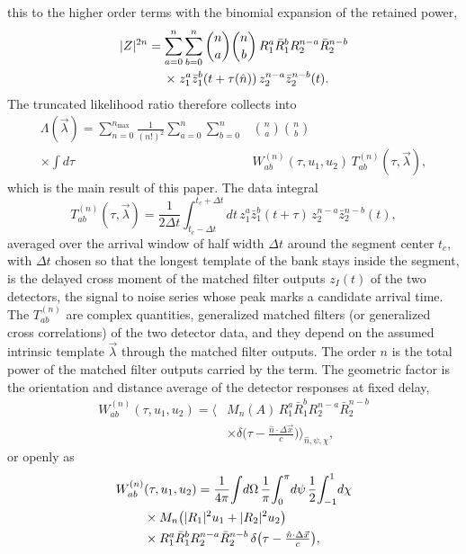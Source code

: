 \documentclass[aps,prd,twocolumn,superscriptaddress,nofootinbib]{revtex4-2}
\begin{document}
this to the higher order terms with the binomial expansion of the
retained power,
\begin{align}
|Z|^{2n} = \sum_{a=0}^{n}\sum_{b=0}^{n}
\binom{n}{a}\binom{n}{b}\,
& R_1^{a} \bar R_1^{b} R_2^{n-a} \bar R_2^{n-b}\notag\\
\times\; z_1^{a} \bar z_1^{b}(t + \tau(\hat n))\,
& z_2^{n-a} \bar z_2^{n-b}(t).
\label{eq:binomn}
\end{align}
The truncated likelihood ratio therefore collects into
\begin{equation}
\begin{aligned}
\Lambda(\vec\lambda) = \sum_{n=0}^{n_{\max}} \frac{1}{(n!)^2}
\sum_{a=0}^{n} \sum_{b=0}^{n} & \binom{n}{a} \binom{n}{b} \\
\times \int d\tau\, & W^{(n)}_{ab}(\tau, u_1, u_2)\,
T^{(n)}_{ab}(\tau, \vec\lambda),
\end{aligned}
\label{eq:master}
\end{equation}
which is the main result of this paper. The data integral
\begin{equation}
T^{(n)}_{ab}(\tau, \vec\lambda) = \frac{1}{2\Delta t}
\int_{t_c - \Delta t}^{t_c + \Delta t} dt\,
z_1^{a} \bar z_1^{b}(t + \tau)\, z_2^{n-a} \bar z_2^{n-b}(t),
\label{eq:T}
\end{equation}
averaged over the arrival window of half width $\Delta t$ around the
segment center $t_c$, with $\Delta t$ chosen so that the longest
template of the bank stays inside the segment, is the delayed cross
moment of the
matched filter outputs $z_I(t)$ of the two detectors, the signal to
noise series whose peak marks a candidate arrival time. The
$T^{(n)}_{ab}$ are complex quantities, generalized matched filters
(or generalized cross correlations) of the two detector data, and
they depend on the
assumed intrinsic template $\vec\lambda$ through the matched filter
outputs. The order $n$
is the total power of the matched filter outputs carried by the term.
The geometric factor is the orientation and distance average of the
detector responses at fixed delay,
\begin{equation}
\begin{aligned}
W^{(n)}_{ab}(\tau, u_1, u_2) = \Big\langle
& M_n(A)\, R_1^{a} \bar R_1^{b} R_2^{n-a} \bar R_2^{n-b} \\
& \times \delta\big( \tau - \tfrac{\hat n \cdot \Delta \vec x}{c} \big)
\Big\rangle_{\hat n, \psi, \chi},
\end{aligned}
\label{eq:W}
\end{equation}
or openly as
\begin{align}
W^{(n)}_{ab}&(\tau, u_1, u_2)
= \frac{1}{4\pi}\!\int\! d\Omega\,
\frac{1}{\pi}\!\int_0^\pi\! d\psi\,
\frac{1}{2}\!\int_{-1}^{1}\! d\chi\notag\\
&\times M_n\big( |R_1|^2 u_1 + |R_2|^2 u_2 \big)\notag\\
&\times R_1^{a} \bar R_1^{b} R_2^{n-a} \bar R_2^{n-b}\,
\delta\big( \tau - \tfrac{\hat n \cdot \Delta \vec x}{c} \big),
\label{eq:Wopen}
\end{align}
\end{document}
